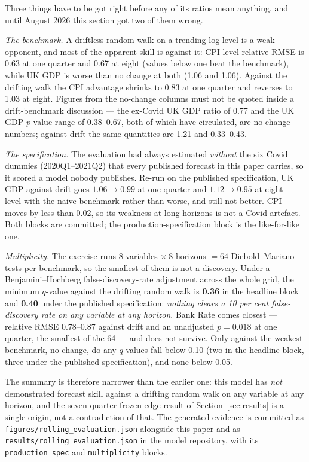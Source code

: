 Three things have to be got right before any of its ratios mean anything, and
until August 2026 this section got two of them wrong.

\emph{The benchmark.} A driftless random walk on a trending log level is a weak
opponent, and most of the apparent skill is against it: CPI-level relative RMSE
is 0.63 at one quarter and 0.67 at eight (values below one beat the benchmark),
while UK GDP is worse than no change at both (1.06 and 1.06). Against the
drifting walk the CPI advantage shrinks to 0.83 at one quarter and reverses to
1.03 at eight. Figures from the no-change columns must not be quoted inside a
drift-benchmark discussion --- the ex-Covid UK GDP ratio of 0.77 and the UK GDP
$p$-value range of 0.38--0.67, both of which have circulated, are no-change
numbers; against drift the same quantities are 1.21 and 0.33--0.43.

\emph{The specification.} The evaluation had always estimated \emph{without} the
six Covid dummies (2020Q1--2021Q2) that every published forecast in this paper
carries, so it scored a model nobody publishes. Re-run on the published
specification, UK GDP against drift goes $1.06 \to 0.99$ at one quarter and
$1.12 \to 0.95$ at eight --- level with the naive benchmark rather than worse,
and still not better. CPI moves by less than 0.02, so its weakness at long
horizons is not a Covid artefact. Both blocks are committed; the
production-specification block is the like-for-like one.

\emph{Multiplicity.} The exercise runs $8$ variables $\times\ 8$ horizons $= 64$
Diebold--Mariano tests per benchmark, so the smallest of them is not a
discovery. Under a Benjamini--Hochberg false-discovery-rate adjustment across
the whole grid, the minimum $q$-value against the drifting random walk is
\textbf{0.36} in the headline block and \textbf{0.40} under the published
specification: \emph{nothing clears a 10 per cent false-discovery rate on any
variable at any horizon}. Bank Rate comes closest --- relative RMSE 0.78--0.87
against drift and an unadjusted $p = 0.018$ at one quarter, the smallest of the
64 --- and does not survive. Only against the weakest benchmark, no change, do
any $q$-values fall below 0.10 (two in the headline block, three under the
published specification), and none below 0.05.

The summary is therefore narrower than the earlier one: this model has
\emph{not} demonstrated forecast skill against a drifting random walk on any
variable at any horizon, and the seven-quarter frozen-edge result of
Section~\ref{sec:results} is a single origin, not a contradiction of that. The
generated evidence is committed as
\texttt{figures/rolling\_evaluation.json} alongside this paper and as
\texttt{results/rolling\_evaluation.json} in the model repository, with its
\texttt{production\_spec} and \texttt{multiplicity} blocks.

